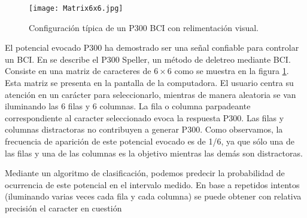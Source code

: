  
\begin{figure}[t]
    \centering
    \texttt{[image: Matrix6x6.jpg]}
    \caption{Configuración típica de un P300 BCI con relimentación visual.}
    \label{fig:Matrix6x6}
\end{figure}

El potencial evocado P300 ha demostrado ser una señal confiable para controlar un BCI. En \cite{farwell1988talking} se describe el P300 Speller, un método de deletreo mediante BCI. Consiste en una matriz de caracteres de $6 \times 6$ como se muestra en la figura \ref{fig:Matrix6x6}. Esta matriz se presenta en la pantalla de la computadora. El usuario centra su atención en un carácter para seleccionarlo, mientras de manera aleatoria se van iluminando las 6 filas y 6 columnas. La fila o columna parpadeante correspondiente al caracter seleccionado evoca la respuesta P300. Las filas y columnas distractoras no contribuyen a generar P300. Como observamos, la frecuencia de aparición de este potencial evocado es de 1/6, ya que sólo una de las filas y una de las columnas es la objetivo mientras las demás son distractoras.

Mediante un algoritmo de clasificación, podemos predecir la probabilidad de ocurrencia de este potencial en el intervalo medido. En base a repetidos intentos (iluminando varias veces cada fila y cada columna) se puede obtener con relativa precisión el caracter en cuestión